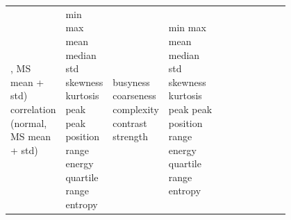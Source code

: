 \begin{table}
\begin{tabular}{@{}P{0.10\linewidth}P{0.10\linewidth}P{0.10\linewidth}P{0.21\linewidth}P{0.10\linewidth}P{0.09\linewidth}P{0.10\linewidth}@{}}
, MS mean + std) \newline correlation (normal, MS mean + std) & min \newline max \newline mean \newline median \newline std \newline skewness \newline kurtosis \newline peak \newline peak position \newline range \newline energy \newline quartile range \newline entropy & busyness \newline coarseness \newline complexity \newline contrast \newline strength & min \newline max \newline mean \newline median \newline std \newline skewness \newline kurtosis \newline peak \newline peak position \newline range \newline energy \newline quartile range \newline entropy \\
		

\end{tabular}
\end{table}
